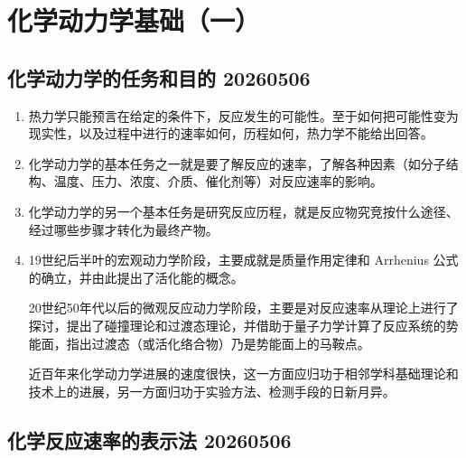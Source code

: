 \section{化学动力学基础（一）}

\subsection{化学动力学的任务和目的 20260506}

\begin{enumerate}
    \item 热力学只能预言在给定的条件下，反应发生的可能性。至于如何把可能性变为现实性，以及过程中进行的速率如何，历程如何，热力学不能给出回答。
    \item 化学动力学的基本任务之一就是要了解反应的速率，了解各种因素（如分子结构、温度、压力、浓度、介质、催化剂等）对反应速率的影响。
    \item 化学动力学的另一个基本任务是研究反应历程，就是反应物究竞按什么途径、经过哪些步骤才转化为最终产物。
    \item 19世纪后半叶的宏观动力学阶段，主要成就是质量作用定律和 Arrhenius 公式的确立，并由此提出了活化能的概念。
    
    20世纪50年代以后的微观反应动力学阶段，主要是对反应速率从理论上进行了探讨，提出了碰撞理论和过渡态理论，并借助于量子力学计算了反应系统的势能面，指出过渡态（或活化络合物）乃是势能面上的马鞍点。

    近百年来化学动力学进展的速度很快，这一方面应归功于相邻学科基础理论和技术上的进展，另一方面归功于实验方法、检测手段的日新月异。 
\end{enumerate}

\subsection{化学反应速率的表示法 20260506}

